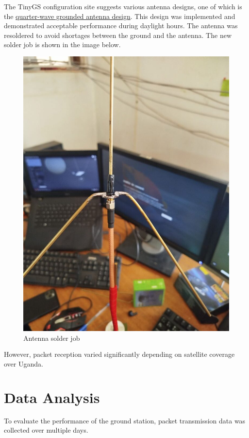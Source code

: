 \documentclass[12pt,a4paper]{article}
\begin{document}
The TinyGS configuration site suggests various antenna designs, one of which is the \href{http://www.n1gy.com/simple-ground-plane-antennas.html}{quarter-wave grounded antenna design}. This design was implemented and demonstrated acceptable performance during daylight hours. The antenna was resoldered to avoid shortages between the ground and the antenna. The new solder job is shown in the image below.
\begin{figure}[H]
    \centering
    \includegraphics[height=\textwidth]{../images/antennaeRedesign.jpg}
    \caption{Antenna solder job}
    \label{fig:antenna_solder_job}
\end{figure}

However, packet reception varied significantly depending on satellite coverage over Uganda.

\section{Data Analysis}
To evaluate the performance of the ground station, packet transmission data was collected over multiple days. 
\end{document}
